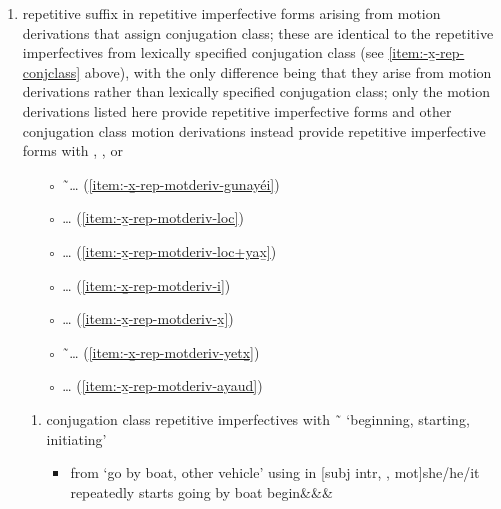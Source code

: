 \begin{morphdesc}[resume*=alphalist]
\begin{enumerate}
	\item	\label{item:-x̱-rep-motderiv}
		repetitive suffix in repetitive imperfective forms
			arising from motion derivations that assign
			 conjugation class;
		these are identical to the  repetitive imperfectives
			from lexically specified  conjugation class
			(see \ref{item:-x̱-rep-conjclass} above),
			with the only difference being that they arise from
			motion derivations rather than lexically specified conjugation class;
		only the motion derivations listed here provide
			 repetitive imperfective forms
			and other  conjugation class motion derivations
			instead provide repetitive imperfective forms with
				,
				,
				or 
		\begin{itemize}
		\item[◦]  \~\ …
			(\ref{item:-x̱-rep-motderiv-g̱unayéi})
		\item[◦]  …
			(\ref{item:-x̱-rep-motderiv-loc})
		\item[◦]	 …
			(\ref{item:-x̱-rep-motderiv-loc+yax̱})
		\item[◦]	…
			(\ref{item:-x̱-rep-motderiv-i})
		\item[◦]	 …
			(\ref{item:-x̱-rep-motderiv-x̱})
		\item[◦]	 \~\ …
			(\ref{item:-x̱-rep-motderiv-yetx̱})
		\item[◦]	…
			(\ref{item:-x̱-rep-motderiv-ayaud})
		\end{itemize}
		\begin{enumerate}
		\item	\label{item:-x̱-rep-motderiv-g̱unayéi}
			 conjugation class repetitive imperfectives with
			 \~\  ‘beginning, starting, initiating’
			\begin{itemize}
			\item	{}
				from  ‘go by boat, other vehicle’
				\newline
				using  in
				\newline
				[subj intr, , mot]{she/he/it repeatedly starts going by boat}
					\parencite[57]{story:1966}
						{begin&&\·\xx{var}&\·}
				\versus {}

\end{itemize}
\end{enumerate}
\end{enumerate}
\end{morphdesc}
